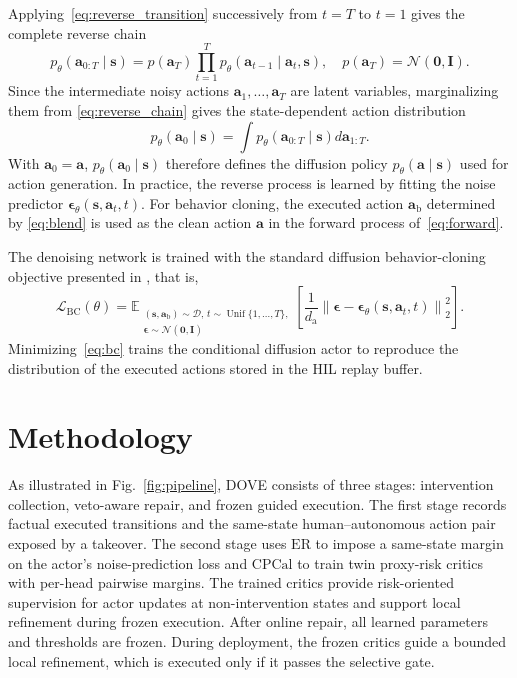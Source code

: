\documentclass[9pt,journal]{IEEEtran}
\newcommand{\DOVE}{DOVE}
\newcommand{\CPCal}{\ensuremath{\mathrm{CPCal}}}
\newcommand{\D}{\mathcal{D}}
\newcommand{\E}{\mathbb{E}}
\newcommand{\ER}{\ensuremath{\mathrm{ER}}}
\newcommand{\va}{\bm{a}}
\newcommand{\vs}{\bm{s}}
\newcommand{\veps}{\bm{\epsilon}}
\newcommand{\vab}{\ensuremath{\va_{\mathrm b}}}      %
\begin{document}
Applying~\eqref{eq:reverse_transition} successively from $t=T$ to
$t=1$ gives the complete reverse chain
\begin{equation}
    p_\theta\!\left(\va_{0:T}\mid\vs\right)
    =
    p\left(\va_T\right)
    \prod_{t=1}^{T}
    p_\theta\!\left(\va_{t-1}\mid\va_t,\vs\right),
    \quad
    p\left(\va_T\right) = \mathcal N(\bm0,\bm I).
    \label{eq:reverse_chain}
\end{equation}
Since the intermediate noisy actions
$\va_1,\ldots,\va_T$ are latent variables, marginalizing them from
\eqref{eq:reverse_chain} gives the state-dependent action distribution
\begin{equation}
    p_\theta\!\left(\va_0\mid\vs\right)
    =
    \int
    p_\theta\!\left(\va_{0:T}\mid\vs\right)
    d\va_{1:T}.
    \label{eq:diffusion_policy}
\end{equation}
With $\va_0=\va$, $p_\theta(\va_0\mid\vs)$ therefore defines the
diffusion policy $p_\theta(\va\mid\vs)$ used for action generation.
In practice, the reverse process is learned by fitting the noise
predictor $\veps_\theta(\vs,\va_t,t)$.
For behavior cloning, the executed action $\vab$ determined by
\eqref{eq:blend} is used as the clean action $\va$ in the forward
process of~\eqref{eq:forward}.

The denoising network is trained with the standard diffusion
behavior-cloning objective presented in \cite{ho2020ddpm,chi2024diffusionpolicy}, that is,
\begin{equation}
    \mathcal{L}_{\mathrm{BC}}(\theta)
    =
    \E_{\substack{
        (\vs,\vab)\sim\D,\,
        t\sim\operatorname{Unif}\{1,\ldots,T\},\\
        \veps\sim\mathcal N(\bm0,\bm I)
    }}
    \left[
    \frac{1}{d_{\mathrm a}}
    \left\|
    \veps-
    \veps_\theta\!\left(\vs,\va_t,t\right)
    \right\|_2^2
    \right].
    \label{eq:bc}
\end{equation}
Minimizing~\eqref{eq:bc} trains the conditional diffusion actor to
reproduce the distribution of the executed actions stored in the HIL
replay buffer.


\section{Methodology}
\label{sec:method}

As illustrated in Fig.~\ref{fig:pipeline}, \DOVE{} consists of three
stages: intervention collection, veto-aware repair, and frozen guided
execution. The first stage records factual executed transitions and the
same-state human--autonomous action pair exposed by a takeover. The second stage uses \ER{} to impose a same-state margin on the actor's noise-prediction loss and \CPCal{} to train twin proxy-risk critics with per-head pairwise margins. The trained critics provide risk-oriented supervision for actor updates at non-intervention states and support local refinement during frozen execution. After online repair, all learned parameters and
thresholds are frozen. 
During deployment, the frozen critics guide a bounded local
refinement, which is executed only if it passes the selective gate.
\end{document}
